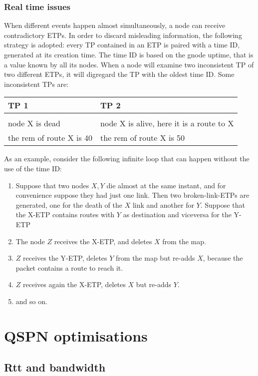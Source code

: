 \documentclass[a4paper]{article}
\begin{document}
\subsubsection{Real time issues}
When different events happen almost simultaneously, a node can receive
contradictory ETPs. In order to discard misleading information, the following
strategy is adopted: every TP contained in an ETP is paired with a time ID,
generated at its creation time. The time ID is based on the gnode uptime, that
is a value known by all its nodes. When a node will examine two inconsistent
TP of two different ETPs, it will digregard the TP with the oldest time ID.
Some inconsistent TPs are:\\
\begin{center}
\begin{tabular}{l|l}
	TP 1 & TP 2\\
	\hline\\
	node X is dead & node X is alive, here it is a route to X\\
	the rem of route X is 40 & the rem of route X is 50
\end{tabular}
\end{center}
As an example, consider the following infinite loop that can happen without
the use of the time ID:
\begin{enumerate}
	\item Suppose that two nodes $X,Y$ die almost at the
		same instant, and for convenience suppose they had just one
		link. Then two broken-link-ETPs are
		generated, one for the death of the $X$ link and
		another for $Y$. Suppose that
		the X-ETP contains routes
		with $Y$ as destination and
		viceversa for the Y-ETP
	\item The node $Z$ receives the X-ETP, and
		deletes $X$ from the map.
	\item $Z$ receives the Y-ETP, deletes $Y$ from
		the map but re-adds $X$, because
		the packet contains a route to reach
		it.
	\item $Z$ receives again the X-ETP, 
		deletes $X$ but re-adds $Y$.
	\item and so on.
\end{enumerate}

%

\section{QSPN optimisations}
\subsection{Rtt and bandwidth}
\label{sec:bandwidth_q1q2}
\end{document}
